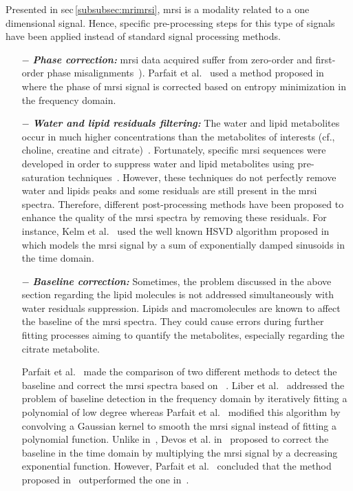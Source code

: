 Presented in \ac{sec}\,\ref{subsubsec:mrimrsi}, \ac{mrsi} is a modality related to a one dimensional signal. Hence, specific pre-processing steps for this type of signals have been applied instead of standard signal processing methods.

\begin{enumerate}[leftmargin=*]

\item[$-$] \textbf{\textit{Phase correction:}} \ac{mrsi} data acquired suffer from zero-order and first-order phase misalignments~\cite{Chen2002,Osorio-Garcia2012}). Parfait et al.~\cite{Parfait2012} used a method proposed in~\cite{Chen2002} where the phase of \ac{mrsi} signal is corrected based on entropy minimization in the frequency domain.

\item[$-$] \textbf{\textit{Water and lipid residuals filtering:}} The water and lipid metabolites occur in much higher concentrations than the metabolites of interests (cf., choline, creatine and citrate)~\cite{Zhu2010,Osorio-Garcia2012}. Fortunately, specific \ac{mrsi} sequences were developed in order to suppress water and lipid metabolites using pre-saturation techniques~\cite{Zhu2010}. However, these techniques do not perfectly remove water and lipids peaks and some residuals are still present in the \ac{mrsi} spectra. Therefore, different post-processing methods have been proposed to enhance the quality of the \ac{mrsi} spectra by removing these residuals.
For instance, Kelm et al.~\cite{Kelm2007} used the well known HSVD algorithm proposed in~\cite{Pijnappel1992} which models the \ac{mrsi} signal by a sum of exponentially damped sinusoids in the time domain.

\item[$-$] \textbf{\textit{Baseline correction:}} Sometimes, the problem discussed in the above section regarding the lipid molecules is not addressed simultaneously with water residuals suppression. Lipids and macromolecules are known to affect the baseline of the \ac{mrsi} spectra. They could cause errors during further fitting processes aiming to quantify the metabolites, especially regarding the citrate metabolite.
  
  Parfait et al.~\cite{Parfait2012} made the comparison of two different methods to detect the baseline and correct the \ac{mrsi} spectra based on ~\cite{Lieber2003,Devos2004}. Liber et al.~\cite{Lieber2003} addressed the problem of baseline detection in the frequency domain by iteratively fitting a polynomial of low degree whereas Parfait et al.~\cite{Parfait2012} modified this algorithm by convolving a Gaussian kernel to smooth the \ac{mrsi} signal instead of fitting a polynomial function. Unlike in~\cite{Lieber2003}, Devos et al. in~\cite{Devos2004} proposed to correct the baseline in the time domain by multiplying the \ac{mrsi} signal by a decreasing exponential function. However, Parfait et al.~\cite{Parfait2012} concluded that the method proposed in~\cite{Lieber2003} outperformed the one in~\cite{Devos2004}. 


\end{enumerate}
